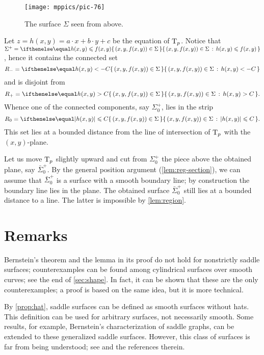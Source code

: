 \begin{figure}[!ht]
\vskip-0mm
\centering
\texttt{[image: mppics/pic-76]}
\caption*{The surface $\Sigma$ seen from above.}
\vskip0mm
\end{figure}


Let $z=h(x,y)=a\cdot x+b\cdot y+c$ be the equation of $\mathrm{T}_p$.
Notice that $\Sigma^{+} \z= \set{(x,y,f(x,y))\in \Sigma}{h(x,y) \leq f(x,y)}$, hence it contains the connected set
\[R_-=\set{(x,y,f(x,y))\in\Sigma}{h(x,y)< -C}\] 
and is disjoint from  
\[R_+=\set{(x,y,f(x,y))\in\Sigma}{h(x,y)> C}.\]
Whence one of the connected components, say $\Sigma^+_0$, lies in the strip
\[R_0=\set{(x,y,f(x,y))\in\Sigma}{|h(x,y)|\le  C}.\]
This set lies at a bounded distance from the line of intersection of $\mathrm{T}_p$ with the $(x,y)$-plane.

Let us move $\mathrm{T}_p$ slightly upward and cut from $\Sigma^+_0$ the piece above the obtained plane, say $\bar\Sigma^+_0$.
By the general position argument (\ref{lem:reg-section}),
we can assume that $\bar\Sigma^+_0$ is a surface with a smooth boundary line;
by construction the boundary line lies in the plane.
The obtained surface $\bar\Sigma^+_0$ still lies at a bounded distance to a line.
The latter is impossible by \ref{lem:region}.
\qeds

\section{Remarks}

Bernstein's theorem and the lemma in its proof do not hold for nonstrictly saddle surfaces;
counterexamples can be found among cylindrical surfaces over smooth curves; see the end of \ref{sec:shape}.
In fact, it can be shown that these are the only counterexamples;
a proof is based on the same idea, but it is more technical.

By \ref{prop:hat}, saddle surfaces can be defined as smooth surfaces without hats.
This definition can be used for arbitrary surfaces, not necessarily smooth.
Some results, for example, Bernstein's characterization of saddle graphs, can be extended to these generalized saddle surfaces.
However, this class of surfaces is far from being understood; see \cite[Chapter 4]{alexander-kapovitch-petrunin2019} and the references therein.

